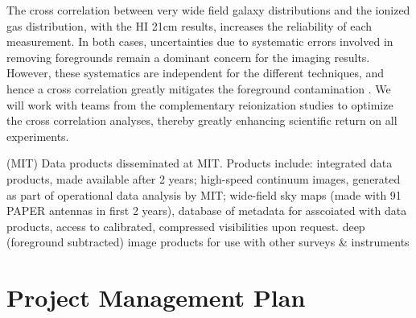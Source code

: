 \documentclass[preprint]{aastex}
\begin{document}
The cross correlation between very wide field galaxy distributions and the
ionized gas distribution, with the HI 21cm results, increases the reliability
of each measurement. In both cases, uncertainties due to systematic errors
involved in removing foregrounds remain a dominant concern for the imaging
results. However, these systematics are independent for the different
techniques, and hence a cross correlation greatly mitigates the foreground
contamination \citep{gong_et_al2011,alvarez_et_al2006,tashiro_et_al2010}. 
We will work with teams from the complementary
reionization studies to optimize the cross correlation analyses, thereby
greatly enhancing scientific return on all experiments. 

%
%
%
%
%
%
%

(MIT) Data products disseminated at MIT.  Products include:
integrated data products, made available after 2 years;
high-speed continuum images, generated as part of operational data analysis by MIT;
wide-field sky maps (made with 91 PAPER antennas in first 2 years),
database of metadata  for asscoiated with data products,
access to calibrated, compressed visibilities upon request.
deep (foreground subtracted) image products for use with other surveys \& instruments

\section{Project Management Plan}
\end{document}
